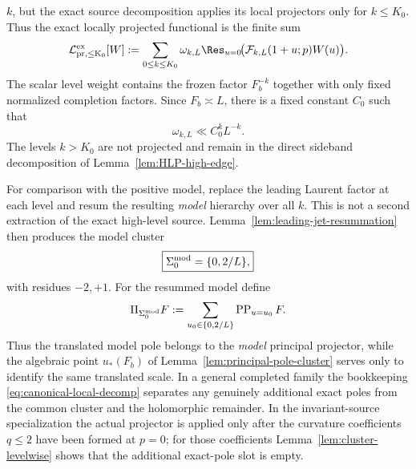 $k$, but the exact source decomposition applies its local projectors only for
$k\le K_0$. Thus the exact locally projected functional is the finite sum
\begin{equation}
\mathcal L_{\rm pr,\le K_0}^{\rm ex}[W]
:=\sum_{0\le k\le K_0}\omega_{k,L}
\Res_{u=0}\!\bigl(\mathcal F_{k,L}(1+u;p)W(u)\bigr).
\label{eq:truncated-exact-principal-functional}
\end{equation}
The scalar level weight contains the frozen factor $F_b^{-k}$ together with
only fixed normalized completion factors. Since $F_b\asymp L$, there is a fixed
constant $C_0$ such that
\begin{equation}
\boxed{\omega_{k,L}\ll C_0^kL^{-k}.}
\label{eq:level-weight-bound}
\end{equation}
The levels $k>K_0$ are not projected and remain in the direct sideband
decomposition of Lemma~\ref{lem:HLP-high-edge}.

For comparison with the positive model, replace the leading Laurent factor at
each level and resum the resulting \emph{model} hierarchy over all $k$. This is
not a second extraction of the exact high-level source. Lemma~\ref{lem:leading-jet-resummation}
then produces the model cluster
\begin{equation}
\boxed{\Sigma_0^{\rm mod}=\{0,2/L\},}
\label{eq:model-principal-cluster}
\end{equation}
with residues $-2,+1$. For the resummed model define
\begin{equation}
\Pi_{\Sigma_0^{\rm mod}}F
:=\sum_{u_0\in\{0,2/L\}}\operatorname{PP}_{u=u_0}F.
\label{eq:model-PP-projector}
\end{equation}
Thus the translated model pole belongs to the \emph{model} principal
projector, while the algebraic point $u_*(F_b)$ of
Lemma~\ref{lem:principal-pole-cluster} serves only to identify the same
translated scale.  In a general completed family the bookkeeping
\eqref{eq:canonical-local-decomp} separates any genuinely additional exact
poles from the common cluster and the holomorphic remainder.  In the
invariant-source specialization the actual projector is applied only after the
curvature coefficients $q\le2$ have been formed at $p=0$; for those
coefficients Lemma~\ref{lem:cluster-levelwise} shows that the additional
exact-pole slot is empty.

